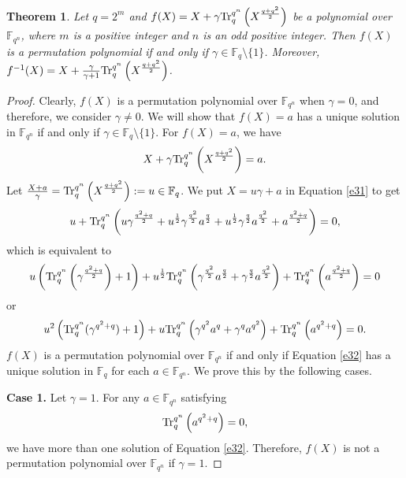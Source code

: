 \documentclass[11pt]{amsart}
\theoremstyle{plain}
\newtheorem{thm}{Theorem}[section]
\numberwithin{equation}{section}
\theoremstyle{definition}
\newcommand{\F}{\mathbb F}
\def\Tr{{\rm Tr}}
\begin{document}
 \begin{thm}\label{T34}
Let $q=2^m$ and $f(X)=X+\gamma \Tr_{q}^{q^n}\left(X^{\frac{q+q^2}{2}}\right)$ be a polynomial over $\F_{q^n}$, where $m$ is a positive integer and $n$ is an odd positive integer. Then $f(X)$ is a permutation polynomial if and only if $\gamma \in \F_{q} \setminus\{1\}$. Moreover, $f^{-1}(X)=X+\frac{\gamma}{\gamma+1}\Tr_{q}^{q^n}\left(X^{\frac{q+q^2}{2}}\right)$.
\end{thm}
\begin{proof}
    Clearly, $f(X)$ is a permutation polynomial over $\F_{q^n}$ when $\gamma=0$, and therefore, we consider $\gamma \neq 0.$ We will show that $f(X)=a$ has a unique solution in $\F_{q^n}$ if and only if $\gamma \in \F_{q} \setminus\{1\}$. For $f(X)=a$, we have 
    \begin{equation}\label{e31}
        X+\gamma \Tr_{q}^{q^n}\left(X^{\frac{q+q^2}{2}}\right)=a.
    \end{equation}
  Let $\frac{X+a}{\gamma}=\Tr_{q}^{q^n}\left(X^{\frac{q+q^2}{2}}\right):=u \in \F_q$. We put $X=u\gamma+a$ in Equation \eqref{e31} to get 
    \begin{equation*}
        u+\Tr_{q}^{q^n}\left(u\gamma^{\frac{q^2+q}{2}}+u^{\frac{1}{2}}\gamma^{\frac{q^2}{2}}a^{\frac{q}{2}}+u^{\frac{1}{2}}\gamma^{\frac{q}{2}}a^{\frac{q^2}{2}}+a^{\frac{q^2+q}{2}}\right)=0,
    \end{equation*}
    which is equivalent to 
    \begin{equation*}
        u\left(\Tr_{q}^{q^n}\left(\gamma^{\frac{q^2+q}{2}}\right)+1\right)+u^{\frac{1}{2}}\Tr_{q}^{q^n}\left(\gamma^{\frac{q^2}{2}}a^{\frac{q}{2}}+\gamma^{\frac{q}{2}}a^{\frac{q^2}{2}}\right)+\Tr_{q}^{q^n}\left(a^{\frac{q^2+q}{2}}\right)=0
    \end{equation*}
    or
    \begin{equation}\label{e32}
        u^2\left(\Tr_{q}^{q^n}(\gamma^{q^2+q})+1\right)+u\Tr_{q}^{q^n}\left(\gamma^{q^2}a^{q}+\gamma^qa^{q^2}\right)+\Tr_{q}^{q^n}\left(a^{q^2+q}\right)=0.
    \end{equation}
   $f(X)$ is a permutation polynomial over $\F_{q^n}$ if and only if Equation \eqref{e32} has a unique solution in $\F_q$ for each $a \in \F_{q^n}$. We prove this by the following cases.

    \textbf{Case 1.} Let $\gamma=1$. For any $a \in \F_{q^n}$ satisfying $$\Tr_{q}^{q^n}\left(a^{q^2+q}\right)=0,$$ we have more than one solution of Equation \eqref{e32}. Therefore, $f(X)$ is not a permutation polynomial over $\F_{q^n}$ if $\gamma=1.$
    

\end{proof}
\end{document}
